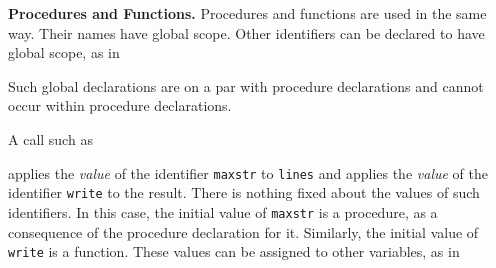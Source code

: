 

\textbf{Procedures and Functions.} Procedures and functions are used
in the same way. Their names have global scope.  Other identifiers can
be declared to have global scope, as in



Such global declarations are on a par with procedure declarations and
cannot occur within procedure declarations.

A call such as



\noindent
applies the \textit{value} of the identifier \texttt{maxstr} to
\texttt{lines} and applies the \textit{value} of the identifier
\texttt{write} to the result. There is nothing fixed about the values
of such identifiers. In this case, the initial value of
\texttt{maxstr} is a procedure, as a consequence of the procedure
declaration for it. Similarly, the initial value of \texttt{write} is
a function. These values can be assigned to other variables, as in



